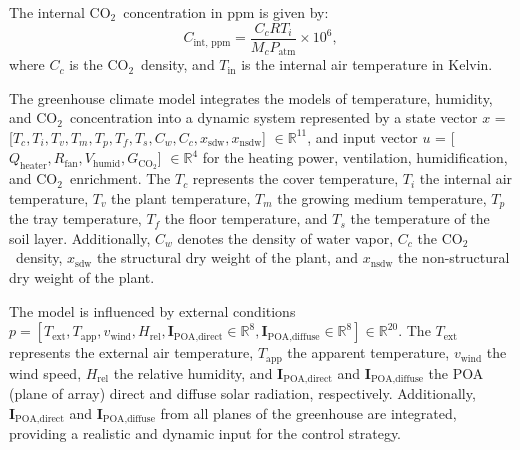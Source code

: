 \documentclass[conference]{IEEEtran}
\newcommand{\coo}{\ensuremath{\mathrm{CO_2}}}
\begin{document}
The internal \coo\ concentration in ppm is given by:
\begin{equation}
    C_{\text{int, ppm}} = \frac{C_c  R  T_i}{M_c  P_{\text{atm}}} \times 10^6,
\end{equation}
where \(C_c\) is the \coo\ density, and \(T_{\text{in}}\) is the internal air temperature in Kelvin.

The greenhouse climate model integrates the models of temperature, humidity, and \coo\ concentration into a dynamic system represented by a state vector \linebreak \(x\) = [\(T_c, T_i, T_v, T_m, T_p, T_f, T_s, C_w, C_c, x_{\text{sdw}}, x_{\text{nsdw}}\)] \( \in\mathbb R^{11} \), and input vector \(u\) = [\(Q_{\text{heater}}, R_{\text{fan}}, V_{\text{humid}}, G_{\coo} \)] \( \in\mathbb R^{4} \) for the heating power, ventilation, humidification, and \coo\ enrichment. The \(T_c\) represents the cover temperature, \(T_i\) the internal air temperature, \(T_v\) the plant temperature, \(T_m\) the growing medium temperature, \(T_p\) the tray temperature, \(T_f\) the floor temperature, and \(T_s\) the temperature of the soil layer. Additionally, \(C_w\) denotes the density of water vapor, \(C_c\) the \coo\ density, \(x_{\text{sdw}}\) the structural dry weight of the plant, and \(x_{\text{nsdw}}\) the non-structural dry weight of the plant.

The model is influenced by external conditions \linebreak \( p = \left[
T_{\text{ext}}, T_{\text{app}}, v_{\text{wind}}, H_{\text{rel}}, \mathbf{I}_{\text{POA,direct}}\in \mathbb{R}^{8}, \mathbf{I}_{\text{POA,diffuse}}\in \mathbb{R}^{8}
\right] \in \mathbb{R}^{20} \). The \(T_{\text{ext}}\) represents the external air temperature, \(T_{\text{app}}\) the apparent temperature, \(v_{\text{wind}}\) the wind speed, \(H_{\text{rel}}\) the relative humidity, and \(\mathbf{I}_{\text{POA,direct}}\) and \(\mathbf{I}_{\text{POA,diffuse}}\) the POA (plane of array) direct and diffuse solar radiation, respectively. Additionally, \(\mathbf{I}_{\text{POA,direct}}\) and \(\mathbf{I}_{\text{POA,diffuse}}\) from all planes of the greenhouse are integrated, providing a realistic and dynamic input for the control strategy.
\end{document}
